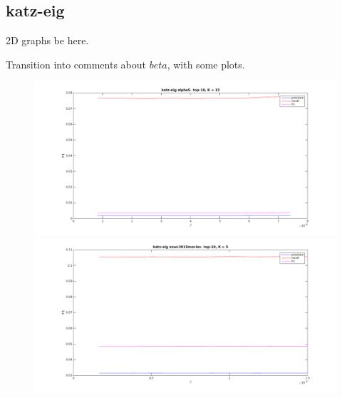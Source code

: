
\subsection{katz-eig}

2D graphs be here.

Transition into comments about $beta$, with some plots.

\begin{figure}[h!]
\centering
\begin{minipage}{.5\textwidth}
    \centering
    \includegraphics[width=\linewidth]{fig/katzeig_beta/alphaS_katzeig_beta.png}
\end{minipage}%
\begin{minipage}{.5\textwidth}
    \centering
    \includegraphics[width=\linewidth]{fig/katzeig_beta/eswc2015movies_katzeig_beta.png}
\end{minipage}
\end{figure}

